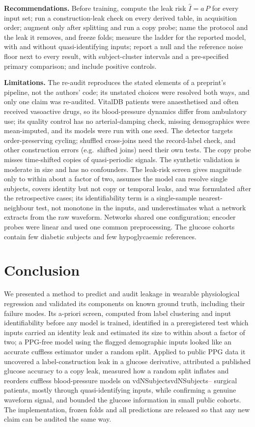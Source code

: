 \documentclass[journal]{IEEEtran}
\newcommand{\m}[1]{\ifcsname #1\endcsname\csname #1\endcsname\else\textcolor{red}{--}\fi}
\begin{document}
\textbf{Recommendations.}  Before training, compute the leak risk
$\hat{I}=a\,P$ for every input set; run a construction-leak check on every
derived table, in acquisition order; augment only after splitting and run a copy
probe; name the protocol and the leak it removes, and freeze folds; measure
the ladder for the reported model, with and without quasi-identifying
inputs; report a null and the reference noise floor next to every result,
with subject-cluster intervals and a pre-specified primary comparison; and
include positive controls.

\textbf{Limitations.}  The re-audit reproduces the stated elements of a
preprint's pipeline, not the authors' code; its unstated choices were
resolved both ways, and only one claim was re-audited.  VitalDB patients
were anaesthetised and often received vasoactive drugs, so its
blood-pressure dynamics differ from ambulatory use; its quality control has
no arterial-damping check, missing demographics were mean-imputed, and its
models were run with one seed.  The detector targets order-preserving
cycling; shuffled cross-joins need the record-label check, and other
construction errors (e.g.\ shifted joins) need their own tests.  The copy
probe misses time-shifted copies of quasi-periodic signals.  The synthetic
validation is moderate in size and has no confounders.  The leak-risk
screen gives magnitude only to within about a factor of two, assumes the
model can resolve single subjects, covers identity but not copy or temporal
leaks, and was formulated after the retrospective cases; its
identifiability term is a single-sample nearest-neighbour test, not
monotone in the inputs, and underestimates what a network extracts from
the raw waveform.  Networks shared one
configuration; encoder probes were linear and used one common
preprocessing.  The glucose cohorts contain few diabetic subjects and few
hypoglycaemic references.

\section{Conclusion}
We presented a method to predict and audit leakage in wearable
physiological regression and validated its components on known ground
truth, including their failure modes.  Its a-priori screen, computed from
label clustering and input identifiability before any model is trained,
identified in a preregistered test which inputs carried an identity leak
and estimated its size to within about a factor of two; a PPG-free model
using the flagged demographic inputs looked like an accurate cuffless
estimator under a random split.  Applied to public PPG data it uncovered a label-construction leak in
a glucose derivative, attributed a published glucose accuracy to a copy
leak, measured how a random split inflates and reorders cuffless
blood-pressure models on \m{vdNSubjects} surgical patients, mostly through
quasi-identifying inputs, while confirming a genuine waveform signal, and
bounded the glucose information in small public cohorts.  The
implementation, frozen folds and all predictions are released so that any
new claim can be audited the same way.


\end{document}
